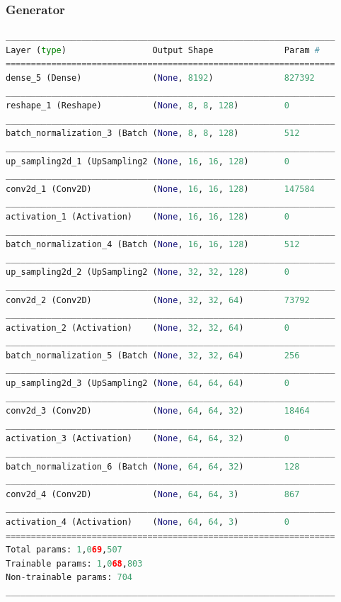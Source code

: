 \documentclass{vldb}
\begin{document}
\subsubsection{Generator} %
\label{sub:generator}
\begin{lstlisting}[basicstyle=\scriptsize,language=Python]
_________________________________________________________________
Layer (type)                 Output Shape              Param #   
=================================================================
dense_5 (Dense)              (None, 8192)              827392    
_________________________________________________________________
reshape_1 (Reshape)          (None, 8, 8, 128)         0         
_________________________________________________________________
batch_normalization_3 (Batch (None, 8, 8, 128)         512       
_________________________________________________________________
up_sampling2d_1 (UpSampling2 (None, 16, 16, 128)       0         
_________________________________________________________________
conv2d_1 (Conv2D)            (None, 16, 16, 128)       147584    
_________________________________________________________________
activation_1 (Activation)    (None, 16, 16, 128)       0         
_________________________________________________________________
batch_normalization_4 (Batch (None, 16, 16, 128)       512       
_________________________________________________________________
up_sampling2d_2 (UpSampling2 (None, 32, 32, 128)       0         
_________________________________________________________________
conv2d_2 (Conv2D)            (None, 32, 32, 64)        73792     
_________________________________________________________________
activation_2 (Activation)    (None, 32, 32, 64)        0         
_________________________________________________________________
batch_normalization_5 (Batch (None, 32, 32, 64)        256       
_________________________________________________________________
up_sampling2d_3 (UpSampling2 (None, 64, 64, 64)        0         
_________________________________________________________________
conv2d_3 (Conv2D)            (None, 64, 64, 32)        18464     
_________________________________________________________________
activation_3 (Activation)    (None, 64, 64, 32)        0         
_________________________________________________________________
batch_normalization_6 (Batch (None, 64, 64, 32)        128       
_________________________________________________________________
conv2d_4 (Conv2D)            (None, 64, 64, 3)         867       
_________________________________________________________________
activation_4 (Activation)    (None, 64, 64, 3)         0         
=================================================================
Total params: 1,069,507
Trainable params: 1,068,803
Non-trainable params: 704
_________________________________________________________________
\end{lstlisting}
\end{document}
